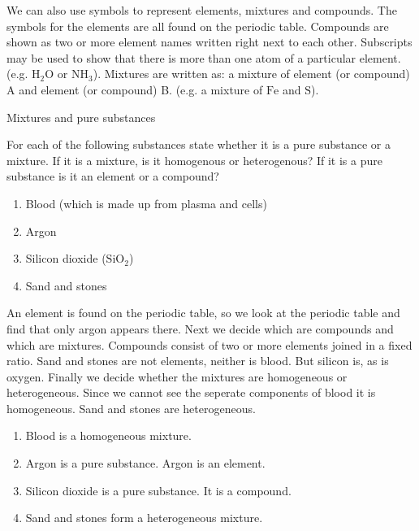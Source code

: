 \label{m38708*id0124}We can also use symbols to represent elements, mixtures and compounds. The symbols for the elements are all found on the periodic table. Compounds are shown as two or more element names written right next to each other. Subscripts may be used to show that there is more than one atom of a particular element. (e.g. $\text{H}{}_{2}\text{O}$ or $\text{NH}_{3}$). Mixtures are written as: a mixture of element (or compound) A and element (or compound) B. (e.g. a mixture of $\text{Fe}$ and $\text{S}$).\par 
\label{m38708*eip-524}
      \begin{wex}
{Mixtures and pure substances}
{For each of the following substances state whether it is a pure substance or a mixture. If it is a mixture, is it homogenous or heterogenous? If it is a pure substance is it an element or a compound? 
\label{m38708*eip-id1167351497334}\begin{enumerate}[noitemsep, label=\textbf{\alph*}. ] 
\item Blood (which is made up from plasma and cells)
\item Argon
\item Silicon dioxide (${\text{SiO}}_{2}$)
\item Sand and stones
\end{enumerate}
  }
{
An element is found on the periodic table, so we look at the periodic table and find that only argon appears there. Next we decide which are compounds and which are mixtures. Compounds consist of two or more elements joined in a fixed ratio. Sand and stones are not elements, neither is blood. But silicon is, as is oxygen. Finally we decide whether the mixtures are homogeneous or heterogeneous. Since we cannot see the seperate components of blood it is homogeneous. Sand and stones are heterogeneous.
{}
\begin{enumerate}
[noitemsep, label=\textbf{\alph*}. ]
\item Blood is a homogeneous mixture.
\item Argon is a pure substance. Argon is an element.
\item Silicon dioxide is a pure substance. It is a compound.
\item Sand and stones form a heterogeneous mixture.
\end{enumerate}}
    \end{wex}

